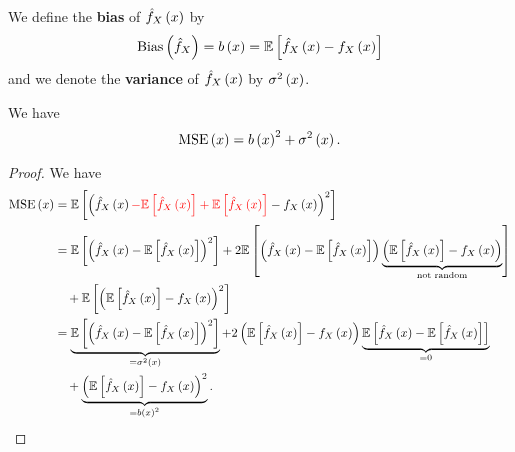 \begin{definition}
  We define the \textbf{bias} of $\hat{f}_X\left(x\right)$ by
  \begin{equation*}
    \mathrm{Bias}\left(\hat{f}_X\right) = b\left(x\right) = \mathbb{E}\left[\hat{f}_X\left(x\right) - f_X\left(x\right)\right]
  \end{equation*}
  and we denote the \textbf{variance} of $\hat{f}_X\left(x\right)$ by $\sigma^2\left(x\right)$.
\end{definition}

\begin{proposition}
  We have
  \begin{equation*}
    \mathrm{MSE}\left(x\right) = b\left(x\right)^2 + \sigma^2\left(x\right).
  \end{equation*}
\end{proposition}
\begin{proof}
  We have
  \begin{equation*}
    \begin{split}
      \mathrm{MSE}\left(x\right) & = \mathbb{E}\left[ \left(\hat{f}_X\left(x\right) {\color{red}- \mathbb{E}\left[\hat{f}_X\left(x\right)\right] + \mathbb{E}\left[\hat{f}_X\left(x\right)\right]} - f_X\left(x\right)\right)^2\right]                                                                                              \\
                 & = \mathbb{E}\left[ \left(\hat{f}_X\left(x\right) - \mathbb{E}\left[\hat{f}_X\left(x\right)\right]\right)^2\right] + 2 \mathbb{E}\left[\left(\hat{f}_X\left(x\right)- \mathbb{E}\left[\hat{f}_X\left(x\right)\right]\right)\underbrace{\left(\mathbb{E}\left[\hat{f}_X\left(x\right)\right] - f_X\left(x\right)\right)}_{\text{not random}} \right]             \\
                 & \quad + \mathbb{E}\left[\left(\mathbb{E}\left[\hat{f}_X\left(x\right)\right] - f_X\left(x\right)\right)^2\right]                                                                                                                                                  \\
                 & = \underbrace{\mathbb{E}\left[ \left(\hat{f}_X\left(x\right) - \mathbb{E}\left[\hat{f}_X\left(x\right)\right]\right)^2\right]}_{=\sigma^2\left(x\right)} + 2 \left(\mathbb{E}\left[\hat{f}_X\left(x\right)\right] - f_X\left(x\right)\right) \underbrace{\mathbb{E}\left[\hat{f}_X\left(x\right)- \mathbb{E}\left[\hat{f}_X\left(x\right)\right]\right] }_{=0} \\
                 & \quad + \underbrace{\left(\mathbb{E}\left[\hat{f}_X\left(x\right)\right] - f_X\left(x\right)\right)^2}_{=b\left(x\right)^2}.                                                                                                                               \\
    \end{split}
  \end{equation*}
\end{proof}


